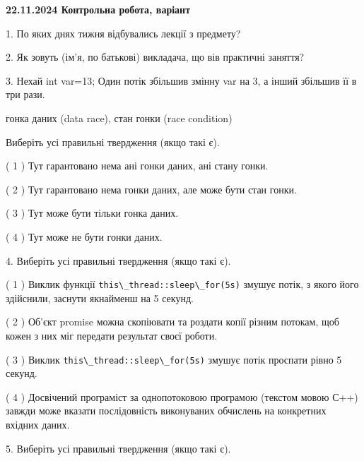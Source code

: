 \documentclass[12pt, ukrainian]{article}
\def\code#1{\Verb!#1!}
\begin{document}
\vspace{4mm}
\newpage
\begin {large}

\textbf{22.11.2024 Контрольна робота, варіант  }\par


{
1. По яких днях тижня відбувались лекції з предмету?



\vspace{5mm}
2. Як зовуть (ім'я, по батькові) викладача, що вів практичні заняття?



\vspace{5mm}
3. Нехай int var=13; Один потік збільшив змінну var на 3, а інший збільшив її в три рази.

гонка даних (data race), стан гонки (race condition)

Виберіть усі правильні твердження (якщо такі є).\par
\vspace{2mm}
( 1 ) Тут гарантовано нема ані гонки даних, ані стану гонки.%

( 2 ) Тут гарантовано нема гонки даних, але може бути стан гонки.%

( 3 ) Тут може бути тільки гонка даних.%

( 4 ) Тут може не бути гонки даних.%


\vspace{5mm}
4. Виберіть усі правильні твердження (якщо такі є).\par
\vspace{2mm}

( 1 ) Виклик функції \code{this\_thread::sleep\_for(5s)} змушує потік, з якого його здійснили, заснути якнайменш на 5 секунд.%

( 2 ) Об’єкт promise можна скопіювати та роздати копії різним потокам, щоб кожен з них міг передати результат своєї роботи.%

( 3 ) Виклик \code{this\_thread::sleep\_for(5s)} змушує потік проспати рівно 5 секунд.%

( 4 ) Досвічений програміст за однопотоковою програмою (текстом мовою С++) завжди може вказати послідовність виконуваних обчислень на конкретних вхідних даних.%


\vspace{5mm}
5. Виберіть усі правильні твердження (якщо такі є).\par
\vspace{2mm}

}
\end{large}
\end{document}
